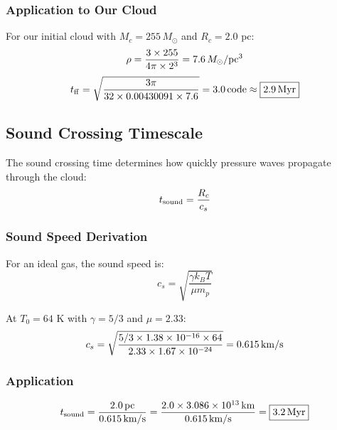 \documentclass[twocolumn,amsmath,amssymb,prd,superscriptaddress,nofootinbib]{revtex4-2}
\begin{document}
\subsubsection{Application to Our Cloud}

For our initial cloud with $M_c = 255\,M_\odot$ and $R_c = 2.0$ pc:
\begin{equation}
    \rho = \frac{3 \times 255}{4\pi \times 2^3} = 7.6\,M_\odot/{\rm pc}^3
\end{equation}
\begin{equation}
    t_{\rm ff} = \sqrt{\frac{3\pi}{32 \times 0.00430091 \times 7.6}} = 3.0\,{\rm code} \approx \boxed{2.9\,{\rm Myr}}
\end{equation}

\subsection{Sound Crossing Timescale}
\label{sec:t_sound}

The sound crossing time determines how quickly pressure waves propagate through the cloud:
\begin{equation}
    t_{\rm sound} = \frac{R_c}{c_s}
    \label{eq:t_sound}
\end{equation}

\subsubsection{Sound Speed Derivation}

For an ideal gas, the sound speed is:
\begin{equation}
    c_s = \sqrt{\frac{\gamma k_B T}{\mu m_p}}
    \label{eq:cs}
\end{equation}

At $T_0 = 64$ K with $\gamma = 5/3$ and $\mu = 2.33$:
\begin{equation}
    c_s = \sqrt{\frac{5/3 \times 1.38 \times 10^{-16} \times 64}{2.33 \times 1.67 \times 10^{-24}}} = 0.615\,{\rm km/s}
\end{equation}

\subsubsection{Application}

\begin{equation}
    t_{\rm sound} = \frac{2.0\,{\rm pc}}{0.615\,{\rm km/s}} = \frac{2.0 \times 3.086 \times 10^{13}\,{\rm km}}{0.615\,{\rm km/s}} = \boxed{3.2\,{\rm Myr}}
\end{equation}
\end{document}
